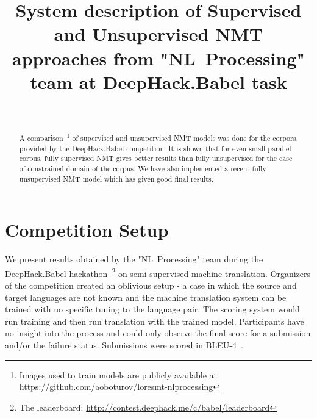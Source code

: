 \documentclass[]{article}
\begin{document}
\begin{acronym}
\end{acronym}

\title{\bf System description of Supervised and Unsupervised  \acl{NMT} approaches from {"NL~Processing"} team at DeepHack.Babel task}
\author{ \hfill  {}\\
\AND
         \hfill {}
}

\maketitle
\pagestyle{empty}

\begin{abstract}
  A comparison~\footnote{Images used to train models are publicly available at \url{https://github.com/aoboturov/loresmt-nlprocessing}} of supervised and unsupervised \ac{NMT} models was done for the corpora provided by the DeepHack.Babel competition.
  It is shown that for even small parallel corpus, fully supervised \ac{NMT} gives better results than fully unsupervised for the case of constrained domain of the corpus.
  We have also implemented a recent fully unsupervised \ac{NMT} model which has given good final results.
\end{abstract}

\section{Competition Setup}
\label{sect:setup}

We present results obtained by the "NL~Processing" team during the DeepHack.Babel hackathon~\footnote{The leaderboard: \url{http://contest.deephack.me/c/babel/leaderboard}} on semi-supervised machine translation.
Organizers of the competition created an oblivious setup - a case in which the source and target languages are not known and the machine translation system can be trained with no specific tuning to the language pair.
The scoring system would run training and then run translation with the trained model.
Participants have no insight into the process and could only observe the final score for a submission and/or the failure status.
Submissions were scored in BLEU-4~\citep{papineni2002bleu}.
\end{document}
